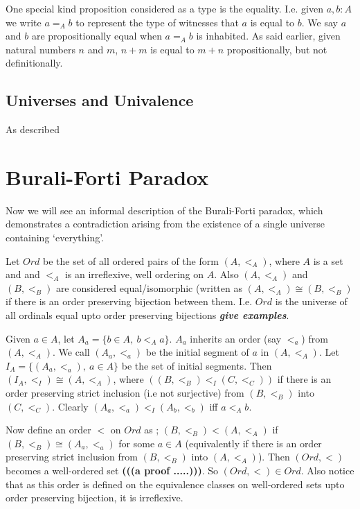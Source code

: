 \documentclass[10pt]{article}
\theoremstyle{definition}
\theoremstyle{plain}
\theoremstyle{remark}
\begin{document}
One special kind proposition considered as a type is the equality. I.e. given $a,b : A$ we
write $a =_A b$ to represent the type of witnesses that $a$ is equal to $b$. We say $a$ and
$b$ are propositionally equal when $a =_A b$ is inhabited. As said earlier, given natural
numbers $n$ and $m$, $n+m$ is equal to $m+n$ propositionally, but not definitionally. 

\subsection{Universes and Univalence}

As described 



\section{Burali-Forti Paradox}\label{S:BFP}

Now we will see an informal description of the Burali-Forti paradox, which demonstrates a
contradiction arising from the existence of a single universe containing `everything'.\smallskip

Let $Ord$ be the set of all ordered pairs of the form $(A, <_A)$, where $A$ is a set and
and $<_A$ is an irreflexive, well ordering on $A$. Also $(A, <_A)$ and $(B, <_B)$ are 
considered equal/isomorphic (written as $(A,<_A) \cong (B,<_B)$ if there is an order 
preserving bijection between them. I.e. $Ord$ is the universe of all ordinals equal upto 
order preserving bijections \textbf{\textit{give examples}}.\smallskip

Given $a\in A$, let $A_a = \{b \in A,\ b <_A a \}$. $A_a$ inherits an order (say $<_a$)
from $(A, <_A)$. We call $(A_a, <_a)$ be the initial segment of $a$ in $(A, <_A)$. Let
$I_A = \{(A_a, <_a),\ a\in A\}$ be the set of initial segments. Then 
$(I_A,<_I) \cong (A, <_A)$, where $((B,<_B) <_I (C,<_C))$ if there is an order preserving 
strict inclusion (i.e not surjective) from $(B,<_B)$ into $(C,<_C)$. Clearly 
$(A_a,<_a) <_I (A_b,<_b)$ iff $a <_A b$.\smallskip

Now define an order $<$ on $Ord$ as ; $(B,<_B) < (A, <_A)$ if $(B, <_B) \cong (A_a, <_a)$ 
for some $a \in A$ (equivalently if there is an order preserving strict inclusion 
from $(B,<_B)$ into $(A,<_A)$). Then $(Ord, <)$ becomes a well-ordered set 
\textbf{(((a proof .....)))}. So $(Ord, <) \in Ord$. Also notice that as this order is defined 
on the equivalence classes on well-ordered sets upto order preserving bijection, it is 
irreflexive.\smallskip
\end{document}
